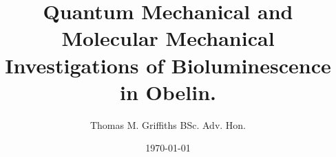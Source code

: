 \documentclass[12pt,oneside]{article}
\author{Thomas M. Griffiths BSc. Adv. Hon.}
\title{Quantum Mechanical and Molecular Mechanical Investigations of Bioluminescence in Obelin.}
\date{\today}
\begin{document}
\maketitle

\declaration
\end{document}
